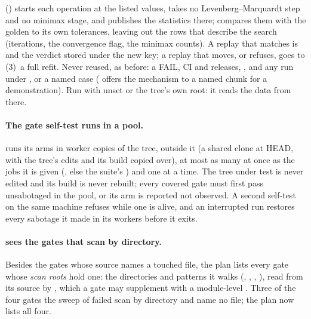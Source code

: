\documentclass[11pt,a4paper]{article}
\begin{document}
() starts each operation at the
listed values, takes no Levenberg--Marquardt step and no minimax stage, and
publishes the statistics there;  compares them with the golden
to its own tolerances, leaving out the rows that describe the search (iterations,
the convergence flag, the minimax counts).  A replay that matches is 
and the verdict stored under the new key; a replay that moves, or refuses, goes
to (3)~a full refit.  Never reused, as before: a FAIL, CI and releases,
, and any run under ,  or a named
case ( offers the mechanism to a named chunk for a
demonstration).  Run  with  unset or
the tree's own root: it reads the data from there.

\paragraph{The gate self-test runs in a pool.}  
runs its arms in worker copies of the tree, outside it (a shared clone at
HEAD, with the tree's edits and its build copied over), at most as many at
once as the jobs it is given (, else the suite's
) and one  at a time.  The tree under test is never edited
and its build is never rebuilt; every covered gate must first pass
unsabotaged in the pool, or its arm is reported not observed.  A second
self-test on the same machine refuses while one is alive, and an interrupted
run restores every sabotage it made in its workers before it exits.

\paragraph{ sees the gates that scan by
directory.}  Besides the gates whose source names a touched file, the plan
lists every gate whose \emph{scan roots} hold one: the directories and
patterns it walks (, , ,
), read from its source by
, which a gate may supplement with a
module-level .  Three of the four gates the sweep of
 failed scan by directory and name no file; the plan now
lists all four.
\end{document}
